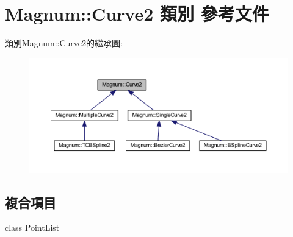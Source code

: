 \hypertarget{class_magnum_1_1_curve2}{}\section{Magnum\+:\+:Curve2 類別 參考文件}
\label{class_magnum_1_1_curve2}


類別\+Magnum\+:\+:Curve2的繼承圖\+:\nopagebreak
\begin{figure}[H]
\begin{center}
\leavevmode
\includegraphics[width=350pt]{class_magnum_1_1_curve2__inherit__graph}
\end{center}
\end{figure}
\subsection*{複合項目}
\begin{DoxyCompactItemize}
\item 
class \hyperlink{class_magnum_1_1_curve2_1_1_point_list}{Point\+List}
\end{DoxyCompactItemize}
